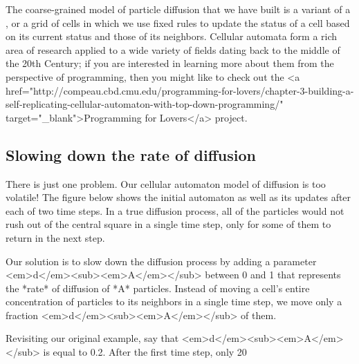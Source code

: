 {{{{{{{{\begin{qbox}\end{qbox}


The coarse-grained model of particle diffusion that we have built is a variant of a , or a grid of cells in which we use fixed rules to update the status of a cell based on its current status and those of its neighbors. Cellular automata form a rich area of research applied to a wide variety of fields dating back to the middle of the 20th Century; if you are interested in learning more about them from the perspective of programming, then you might like to check out the <a href="http://compeau.cbd.cmu.edu/programming-for-lovers/chapter-3-building-a-self-replicating-cellular-automaton-with-top-down-programming/" target="_blank">Programming for Lovers</a> project.

\FloatBarrier
{}
\subsection{Slowing down the rate of diffusion}

There is just one problem. Our cellular automaton model of diffusion is too volatile! The figure below shows the initial automaton as well as its updates after each of two time steps. In a true diffusion process, all of the particles would not rush out of the central square in a single time step, only for some of them to return in the next step.

{%

Our solution is to slow down the diffusion process by adding a parameter <em>d</em><sub><em>A</em></sub> between 0 and 1 that represents the *rate* of diffusion of *A* particles. Instead of moving a cell's entire concentration of particles to its neighbors in a single time step, we move only a fraction <em>d</em><sub><em>A</em></sub> of them.

Revisiting our original example, say that <em>d</em><sub><em>A</em></sub> is equal to 0.2. After the first time step, only 20%

}}}}}}}}}
